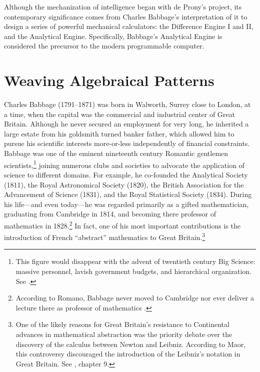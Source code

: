 \documentclass[version=last,draft=false,paper=A4,portrait,twoside=true,twocolumn=false,headinclude=false,footinclude=false,mpinclude=true,fontsize=12,BCOR=20mm,DIV=calc,pagesize=auto,open=right,chapterprefix=true,numbers=autoendperiod,headsepline=false,headings=twolinechapter,parskip=false]{scrbook}
\begin{document}
Although the mechanization of intelligence began with de Prony's project,
its contemporary significance comes from Charles Babbage's interpretation
of it to design a series of powerful mechanical calculators: the Difference
Engine I and II, and the Analytical Engine. Specifically, Babbage's
Analytical Engine is considered the precursor to the modern programmable
computer.

\section{Weaving Algebraical Patterns}
\label{sec:orgfc6e4f3}

Charles Babbage (1791--1871) was born in Walworth, Surrey close to London,
at a time, when the capital was the commercial and industrial center of
Great Britain. Although he never secured an employment for very long, he
inherited a large estate from his goldsmith turned banker father, which
allowed him to pursue his scientific interests more-or-less independently
of financial constraints. Babbage was one of the eminent nineteenth century
Romantic gentlemen scientists,\footnote{This figure would disappear with the advent of twentieth century
Big Science: massive personnel, lavish government budgets, and hierarchical
organization. See \textcite{mirowski2011}.} joining numerous clubs and societies
to advocate the application of science to different domains. For example,
he co-founded the Analytical Society (1811), the Royal Astronomical Society
(1820), the British Association for the Advancement of Science (1831), and
the Royal Statistical Society (1834). During his life---and even today---he
was regarded primarily as a gifted mathematician, graduating from Cambridge
in 1814, and becoming there professor of mathematics in 1828.\footnote{According to Romano, Babbage never moved to Cambridge nor ever
deliver a lecture there as professor of mathematics
\autocite[387]{romano1982}.} In
fact, one of his most important contributions is the introduction of French
``abstract'' mathematics to Great Britain.\footnote{One of the likely reasons for Great Britain's resistance to
Continental advances in mathematical abstraction was the priority debate
over the discovery of the calculus between Newton and Leibniz. According to
Maor, this controversy discouraged the introduction of the Leibniz's
notation in Great Britain. See \textcite{romano1982}, chapter 9.}
\end{document}
